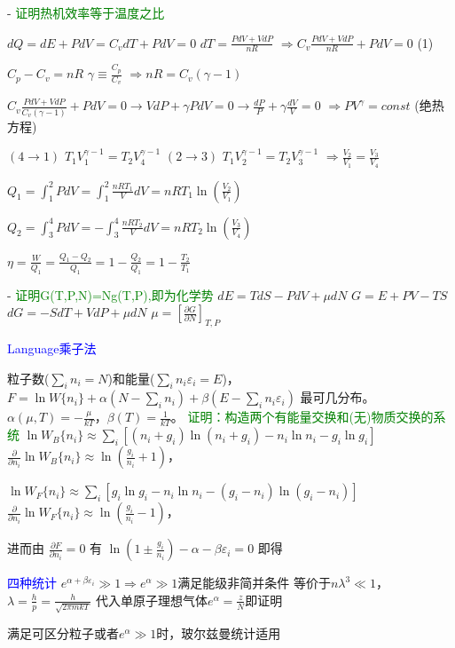 \documentclass[a4paper,8pt]{extarticle} %
\newcommand{\bluetext}[1]{\textcolor{blue}{#1}}
\newcommand{\greentext}[1]{\textcolor{green}{#1}}
\begin{document}
\begin{multicols}{3}
- \greentext{证明热机效率等于温度之比}

$dQ = dE + PdV = C_v dT + PdV = 0$
$ dT = \frac{PdV + VdP}{nR}$
$\Rightarrow C_v \frac{PdV + VdP}{nR} + PdV = 0$ (1)

$C_p - C_v = nR$
$\gamma \equiv \frac{C_p}{C_v}$
$\Rightarrow nR = C_v(\gamma-1)$

$C_v \frac{PdV + VdP}{C_v(\gamma-1)} + PdV = 0 \rightarrow VdP + \gamma PdV = 0 \rightarrow \frac{dP}{P} + \gamma \frac{dV}{V} = 0$
$\Rightarrow PV^\gamma = const$ (绝热方程)

$(4 \rightarrow 1)$ $T_1V_1^{\gamma-1} = T_2V_4^{\gamma-1}$
$(2 \rightarrow 3)$ $T_1V_2^{\gamma-1} = T_2V_3^{\gamma-1}$
$\Rightarrow \frac{V_2}{V_1} = \frac{V_3}{V_4}$

$Q_1 = \int_1^2 PdV = \int_1^2 \frac{nRT_1}{V}dV = nRT_1 \ln(\frac{V_2}{V_1})$

$Q_2 = \int_3^4 PdV = -\int_3^4 \frac{nRT_2}{V}dV = nRT_2 \ln(\frac{V_3}{V_4})$

$\eta = \frac{W}{Q_1} = \frac{Q_1-Q_2}{Q_1} = 1-\frac{Q_2}{Q_1} = 1-\frac{T_2}{T_1}$

- \greentext{证明G(T,P,N)=Ng(T,P),即为化学势}
$dE = TdS - PdV + \mu dN$
$G = E + PV - TS$
$dG = -SdT + VdP + \mu dN$
$\mu = \left[\frac{\partial G}{\partial N}\right]_{T,P}$

\bluetext{Language乘子法}

粒子数($\sum_i n_i = N$)和能量($\sum_i n_i\varepsilon_i = E$)，$F = \ln W\{n_i\} + \alpha(N-\sum_i n_i) + \beta(E-\sum_i n_i\varepsilon_i)$ 最可几分布。$\alpha(\mu,T) = -\frac{\mu}{kT}$，$\beta(T) = \frac{1}{kT}$。
\greentext{证明：构造两个有能量交换和(无)物质交换的系统}
$\ln W_B\{n_i\} \approx \sum_i [(n_i + g_i)\ln(n_i + g_i) - n_i \ln n_i - g_i \ln g_i]$
$\frac{\partial}{\partial n_i}\ln W_B\{n_i\} \approx \ln(\frac{g_i}{n_i} + 1)$，

$\ln W_F\{n_i\} \approx \sum_i [g_i \ln g_i - n_i \ln n_i - (g_i - n_i)\ln(g_i - n_i)]$
$\frac{\partial}{\partial n_i}\ln W_F\{n_i\} \approx \ln(\frac{g_i}{n_i} - 1)$，

进而由 $\frac{\partial F}{\partial n_i} = 0$ 有 $\ln(1 \pm \frac{g_i}{n_i}) - \alpha - \beta\varepsilon_i = 0$ 即得

\bluetext{四种统计}
$e^{\alpha+\beta\varepsilon_i} \gg 1 \Rightarrow e^\alpha \gg 1$满足能级非简并条件
等价于$n\lambda^3 \ll 1$，$\lambda = \frac{h}{p} = \frac{h}{\sqrt{2\pi mkT}}$
代入单原子理想气体$e^\alpha = \frac{z}{N}$即证明

满足可区分粒子或者$e^\alpha \gg 1$时，玻尔兹曼统计适用


\end{multicols}
\end{document}
